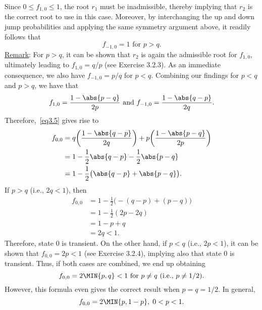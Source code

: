 \begin{Example}
    Since $ 0\le f_{1,0}\le 1 $, the root $ r_1 $ must be inadmissible,
    thereby implying that $ r_2 $ is the correct root to use in this case.
    Moreover, by interchanging the up and down jump probabilities and applying
    the same symmetry argument above, it readily follows that
    \[ f_{-1,0}=1\text{ for $p>q$}. \]
    \underline{Remark}: For $ p>q $, it can be shown that $ r_2 $
    is again the admissible root for $ f_{1,0} $, ultimately leading to
    $ f_{1,0}=q/p $ (see Exercise 3.2.3). As an immediate consequence,
    we also have $ f_{-1,0}=p/q $ for $ p<q $.
    Combining our findings for $ p<q $ and $ p>q $, we have that
    \[ f_{1,0}=\frac{1-\abs{p-q}}{2p} \text{ and }f_{-1,0}=\frac{1-\abs{q-p}}{2q}. \]
    Therefore,~\ref{eq3.5} gives rise to
    \begin{align*}
        f_{0,0}
         & =q\biggl(\frac{1-\abs{q-p}}{2q} \biggr)+p\biggl(\frac{1-\abs{p-q}}{2p} \biggr) \\
         & =1-\frac{1}{2} \abs{q-p}-\frac{1}{2} \abs{p-q}                                 \\
         & =1-\frac{1}{2} \bigl(\abs{q-p}+\abs{p-q}\bigr).
    \end{align*}
    If $ p>q $ (i.e., $ 2q<1 $), then
    \begin{align*}
        f_{0,0}
         & =1-\frac{1}{2} \bigl(-(q-p)+(p-q)\bigr) \\
         & =1-\frac{1}{2}(2p-2q)                   \\
         & =1-p+q                                  \\
         & =2q<1.\label{eq3.7}\tag*{(3.7)}
    \end{align*}
    Therefore, state $ 0 $ is transient. On the other hand, if $ p<q $ (i.e., $ 2p<1 $),
    it can be shown that $ f_{0,0}=2p<1 $ (see Exercise 3.2.4), implying also
    that state $ 0 $ is transient. Thus, if both cases are combined, we end up
    obtaining
    \[ f_{0,0}=2\MIN{p,q}<1\text{ for $ p\ne q $ (i.e., $ p\ne 1/2 $)}. \]
    However, this formula even gives the correct result
    when $ p=q=1/2 $. In general,
    \[ f_{0,0}=2\MIN{p,1-p},\; 0<p<1. \]
\end{Example}
